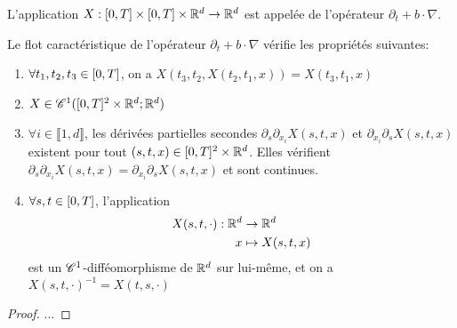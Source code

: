 \documentclass[french,a4paper,10pt]{article}
\begin{document}
            \begin{definition}\label{def:1.2.4}
                L'application $X:\mathopen{}\left[0,T\right]\mathclose{} \times \mathopen{}\left[0,T\right]\mathclose{} \times \mathbb{R}^d \to \mathbb{R}^d$ est appelée  de l'opérateur $\partial_t + b \cdot \nabla$.
            \end{definition}

            \begin{proposition}\label{prop:1.2.5}
                Le flot caractéristique de l'opérateur $\partial_t + b \cdot \nabla$ vérifie les propriétés suivantes:

                \begin{enumerate}
                    \item $\forall t_1,t_2,t_3 \in \mathopen{}\left[0,T\right]\mathclose{}$, on a $X(t_3,t_2,X(t_2,t_1,x)) = X(t_3,t_1,x)$

                    \item $X\in \mathscr{C}^1(\mathopen{}\left[0,T\right]\mathclose{}^2 \times \mathbb{R}^d; \mathbb{R}^d)$

                    \item $\forall i\in \llbracket 1, d \rrbracket$, les dérivées partielles secondes $\partial_s\partial_{x_i}X(s,t,x)$ et $\partial_{x_i}\partial_sX(s,t,x)$ existent pour tout $(s,t,x) \in \mathopen{}\left[0,T\right]\mathclose{}^2 \times \mathbb{R}^d$. Elles vérifient $\partial_s\partial_{x_i}X(s,t,x) = \partial_{x_i}\partial_sX(s,t,x)$ et sont continues.

                    \item $\forall s,t \in \mathopen{}\left[0,T\right]\mathclose{}$, l'application
                    \begin{equation*}
                        \begin{aligned}
                            X(s,t,\cdot):\mathbb{R}^d&\to\mathbb{R}^d \\
                            x &\mapsto X(s,t,x)
                        \end{aligned}
                    \end{equation*}
                    est un $\mathscr{C}^1$-difféomorphisme de $\mathbb{R}^d$ sur lui-même, et on a $X(s,t,\cdot)^{-1} = X(t,s,\cdot)$
                \end{enumerate}
            \end{proposition}

            \begin{proof}
                ...
            \end{proof}
\end{document}
